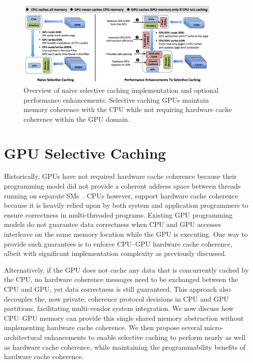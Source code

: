 \begin{figure}[tp]
\centering
\includegraphics[width=0.9\textwidth]{figures/coherence_overview.png}
\caption{Overview of naive selective caching implementation and optional performance enhancements.
Selective caching GPUs maintain memory coherence with the CPU while not
requiring hardware cache coherence within the GPU domain.}
\label{fig:coherence_overview}
\end{figure}

\section{GPU Selective Caching}
\label{proposal}

Historically, GPUs have not required hardware cache coherence because their
programming model did not provide a coherent address space between threads running on separate
SMs~\cite{CUDA7}.  CPUs however, support hardware cache coherence 
because it is heavily relied upon by both system and application
programmers to ensure correctness in multi-threaded programs. 
Existing GPU programming models do not guarantee data correctness when CPU and GPU accesses
interleave on the same memory location while the GPU is executing. One way to
provide such guarantees is to enforce CPU--GPU hardware cache coherence, albeit with significant implementation 
complexity as previously discussed.

Alternatively, if the GPU does not cache any data that is concurrently cached by the CPU,
no hardware coherence messages need to be exchanged between the CPU and GPU, yet data correctness is still guaranteed. 
This approach also decouples
the, now private, coherence protocol decisions in CPU and GPU partitions, facilitating multi-vendor 
system integration.  We now discuss how CPU--GPU
memory can provide this single shared memory abstraction without implementing 
hardware cache coherence. We then propose several micro-architectural enhancements to enable selective caching
to perform nearly as well as hardware cache coherence, while maintaining the programmability benefits of hardware cache coherence.

